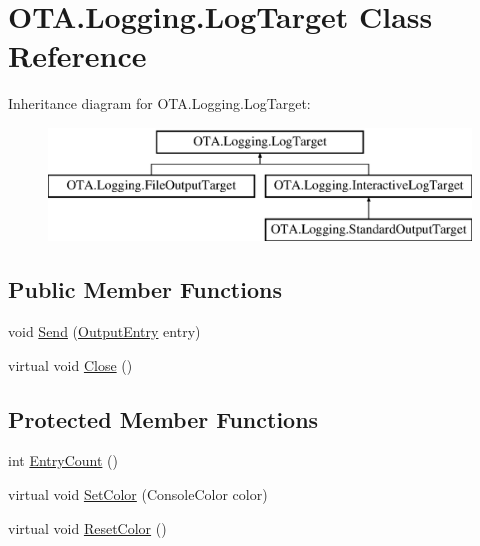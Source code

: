 \hypertarget{class_o_t_a_1_1_logging_1_1_log_target}{}\section{O\+T\+A.\+Logging.\+Log\+Target Class Reference}
\label{class_o_t_a_1_1_logging_1_1_log_target}
Inheritance diagram for O\+T\+A.\+Logging.\+Log\+Target\+:\begin{figure}[H]
\begin{center}
\leavevmode
\includegraphics[height=3.000000cm]{class_o_t_a_1_1_logging_1_1_log_target}
\end{center}
\end{figure}
\subsection*{Public Member Functions}
\begin{DoxyCompactItemize}
\item 
void \hyperlink{class_o_t_a_1_1_logging_1_1_log_target_a41e84636626481fe423f70a771b0c07d}{Send} (\hyperlink{struct_o_t_a_1_1_logging_1_1_output_entry}{Output\+Entry} entry)
\item 
virtual void \hyperlink{class_o_t_a_1_1_logging_1_1_log_target_aec0b143b80ea249471e75fe890cc9602}{Close} ()
\end{DoxyCompactItemize}
\subsection*{Protected Member Functions}
\begin{DoxyCompactItemize}
\item 
int \hyperlink{class_o_t_a_1_1_logging_1_1_log_target_a1c9cc52ea48e03a61c558d8ba411336e}{Entry\+Count} ()
\item 
virtual void \hyperlink{class_o_t_a_1_1_logging_1_1_log_target_ab187384df074492e21ede0ce79043ff3}{Set\+Color} (Console\+Color color)
\item 
virtual void \hyperlink{class_o_t_a_1_1_logging_1_1_log_target_a7a3486524aae95caf014afd2c987170d}{Reset\+Color} ()
\end{DoxyCompactItemize}
